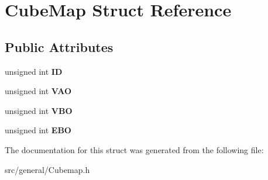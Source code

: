\hypertarget{struct_cube_map}{}\section{Cube\+Map Struct Reference}
\label{struct_cube_map}
\subsection*{Public Attributes}
\begin{DoxyCompactItemize}
\item 
\mbox{\label{struct_cube_map_a998db5de195f17c19e43a970ab5ca25c}} 
unsigned int {\bfseries ID}
\item 
\mbox{\label{struct_cube_map_a03cc8a5513a563d0ac1310916ec9ca6e}} 
unsigned int {\bfseries V\+AO}
\item 
\mbox{\label{struct_cube_map_ab5996da21a1b3e4b216e2cab70a9f18e}} 
unsigned int {\bfseries V\+BO}
\item 
\mbox{\label{struct_cube_map_a70215b075b915c9220b3b92ed9ea8660}} 
unsigned int {\bfseries E\+BO}
\end{DoxyCompactItemize}


The documentation for this struct was generated from the following file\+:\begin{DoxyCompactItemize}
\item 
src/general/Cubemap.\+h\end{DoxyCompactItemize}
